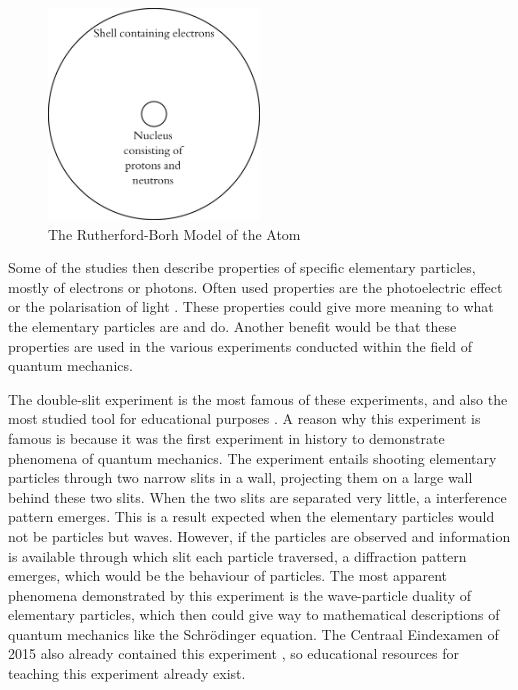 \documentclass[11pt,twoside]{report} %
\begin{document}
\begin{figure}[h!]
\centering
\includegraphics[width=0.5\textwidth]{bohrmodel}
\caption{The Rutherford-Borh Model of the Atom}
\label{fig:bohrmodel}
\end{figure}

Some of the studies \cite{erduran, hubber, muller, thacker} then describe properties of specific elementary particles, mostly of electrons or photons. Often used properties are the photoelectric effect or the polarisation of light \cite{henriksen, mckagan, muller}. These properties could give more meaning to what the elementary particles are and do. Another benefit would be that these properties are used in the various experiments conducted within the field of quantum mechanics.

The double-slit experiment is the most famous of these experiments, and also the most studied tool for educational purposes \cite{asikainen, henriksen, hobson, levrini, mckagan, muller, papaphotis1,singh2, thacker}. A reason why this experiment is famous is because it was the first experiment in history to demonstrate phenomena of quantum mechanics. The experiment entails shooting elementary particles through two narrow slits in a wall, projecting them on a large wall behind these two slits. When the two slits are separated very little, a interference pattern emerges. This is a result expected when the elementary particles would not be particles but waves. However, if the particles are observed and information is available through which slit each particle traversed, a diffraction pattern emerges, which would be the behaviour of particles. The most apparent phenomena demonstrated by this experiment is the wave-particle duality of elementary particles, which then could give way to mathematical descriptions of quantum mechanics like the Schrödinger equation. The Centraal Eindexamen of 2015 also already contained this experiment \cite{eindexamen2015}, so educational resources for teaching this experiment already exist.
\end{document}

